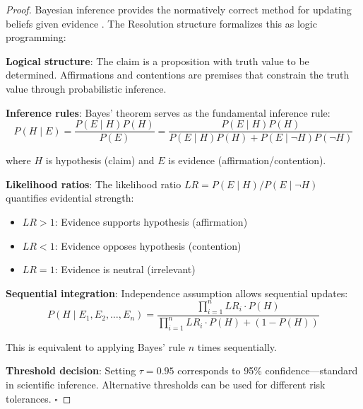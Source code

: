 \begin{proof}
Bayesian inference provides the normatively correct method for updating beliefs given evidence \cite{jaynes2003probability}. The Resolution structure formalizes this as logic programming:

\textbf{Logical structure}: The claim is a proposition with truth value to be determined. Affirmations and contentions are premises that constrain the truth value through probabilistic inference.

\textbf{Inference rules}: Bayes' theorem serves as the fundamental inference rule:
\begin{equation}
P(H \mid E) = \frac{P(E \mid H) P(H)}{P(E)} = \frac{P(E \mid H) P(H)}{P(E \mid H) P(H) + P(E \mid \neg H) P(\neg H)}
\end{equation}

where $H$ is hypothesis (claim) and $E$ is evidence (affirmation/contention).

\textbf{Likelihood ratios}: The likelihood ratio $LR = P(E \mid H)/P(E \mid \neg H)$ quantifies evidential strength:
\begin{itemize}
\item $LR > 1$: Evidence supports hypothesis (affirmation)
\item $LR < 1$: Evidence opposes hypothesis (contention)
\item $LR = 1$: Evidence is neutral (irrelevant)
\end{itemize}

\textbf{Sequential integration}: Independence assumption allows sequential updates:
\begin{equation}
P(H \mid E_1, E_2, \ldots, E_n) = \frac{\prod_{i=1}^n LR_i \cdot P(H)}{\prod_{i=1}^n LR_i \cdot P(H) + (1 - P(H))}
\end{equation}

This is equivalent to applying Bayes' rule $n$ times sequentially.

\textbf{Threshold decision}: Setting $\tau = 0.95$ corresponds to 95\% confidence—standard in scientific inference. Alternative thresholds can be used for different risk tolerances. $\square$
\end{proof}

